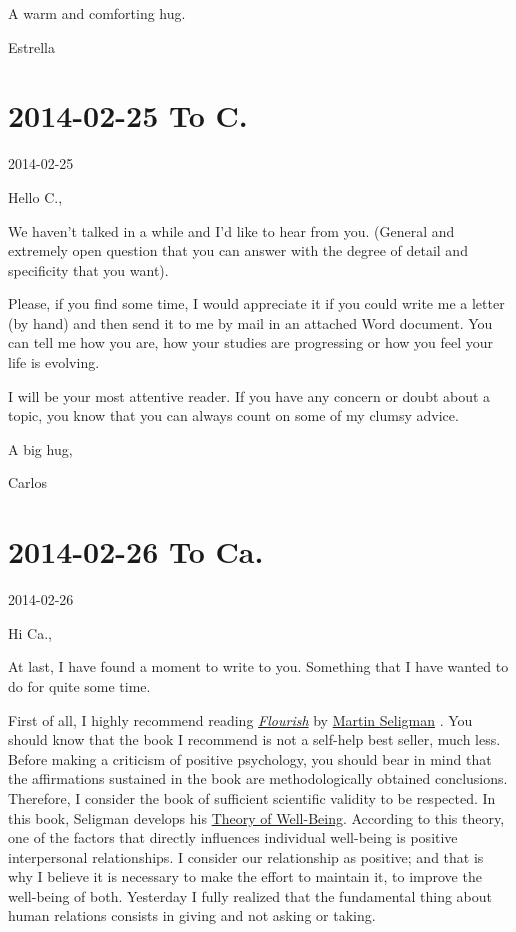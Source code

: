 \documentclass[]{book}
\begin{document}
A warm and comforting hug.

Estrella

\hypertarget{toC20140225}{%
\section*{2014-02-25 To C.}\label{toC20140225}}

2014-02-25

Hello C.,

We haven't talked in a while and I'd like to hear from you. (General and extremely open question that you can answer with the degree of detail and specificity that you want).

Please, if you find some time, I would appreciate it if you could write me a letter (by hand) and then send it to me by mail in an attached Word document. You can tell me how you are, how your studies are progressing or how you feel your life is evolving.

I will be your most attentive reader. If you have any concern or doubt about a topic, you know that you can always count on some of my clumsy advice.

A big hug,

Carlos

\hypertarget{toCa20140226}{%
\section*{2014-02-26 To Ca.}\label{toCa20140226}}

2014-02-26

Hi Ca.,

At last, I have found a moment to write to you. Something that I have wanted to do for quite some time.

First of all, I highly recommend reading \href{https://archive.org/details/flourishvisionar0000seli}{\emph{Flourish}} by \href{https://en.wikipedia.org/wiki/Martin_Seligman}{Martin Seligman} \citep{seligman2012flourish}. You should know that the book I recommend is not a self-help best seller, much less. Before making a criticism of positive psychology, you should bear in mind that the affirmations sustained in the book are methodologically obtained conclusions. Therefore, I consider the book of sufficient scientific validity to be respected. In this book, Seligman develops his \href{https://en.wikipedia.org/wiki/Martin_Seligman\#Well-being}{Theory of Well-Being}. According to this theory, one of the factors that directly influences individual well-being is positive interpersonal relationships. I consider our relationship as positive; and that is why I believe it is necessary to make the effort to maintain it, to improve the well-being of both. Yesterday I fully realized that the fundamental thing about human relations consists in giving and not asking or taking.
\end{document}
